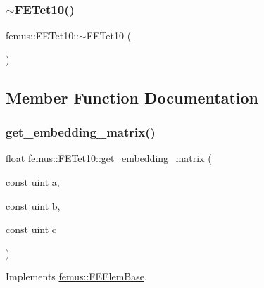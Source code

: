 \mbox{\label{classfemus_1_1_f_e_tet10_a0d4fe455092a4e1ede5fe3fac3cf31ec}} 
\subsubsection{\texorpdfstring{$\sim$\+F\+E\+Tet10()}{~FETet10()}}
{\footnotesize\ttfamily femus\+::\+F\+E\+Tet10\+::$\sim$\+F\+E\+Tet10 (\begin{DoxyParamCaption}{ }\end{DoxyParamCaption})}



\subsection{Member Function Documentation}
\mbox{\label{classfemus_1_1_f_e_tet10_a5db8941e2d1acf599b6119405d1bc77a}} 
\subsubsection{\texorpdfstring{get\+\_\+embedding\+\_\+matrix()}{get\_embedding\_matrix()}}
{\footnotesize\ttfamily float femus\+::\+F\+E\+Tet10\+::get\+\_\+embedding\+\_\+matrix (\begin{DoxyParamCaption}\item[{const \mbox{\hyperlink{_typedefs_8hpp_a91ad9478d81a7aaf2593e8d9c3d06a14}{uint}}}]{a,  }\item[{const \mbox{\hyperlink{_typedefs_8hpp_a91ad9478d81a7aaf2593e8d9c3d06a14}{uint}}}]{b,  }\item[{const \mbox{\hyperlink{_typedefs_8hpp_a91ad9478d81a7aaf2593e8d9c3d06a14}{uint}}}]{c }\end{DoxyParamCaption})\hspace{0.3cm}{\ttfamily [virtual]}}



Implements \mbox{\hyperlink{classfemus_1_1_f_e_elem_base_a0c4d6d5ec66bd4e301eb8ea2ef10f354}{femus\+::\+F\+E\+Elem\+Base}}.

